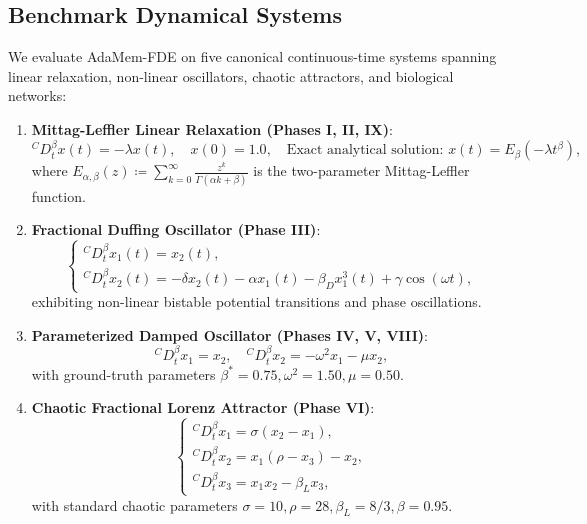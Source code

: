 \documentclass[11pt,a4paper]{article}
\theoremstyle{plain}
\theoremstyle{definition}
\newcommand{\cD}{{}^C D}
\begin{document}
\subsection{Benchmark Dynamical Systems}
We evaluate AdaMem-FDE on five canonical continuous-time systems spanning linear relaxation, non-linear oscillators, chaotic attractors, and biological networks:
\begin{enumerate}
    \item \textbf{Mittag-Leffler Linear Relaxation (Phases I, II, IX)}:
    \begin{equation}
        \cD_t^\beta x(t) = -\lambda x(t), \quad x(0) = 1.0, \quad \text{Exact analytical solution: } x(t) = E_\beta(-\lambda t^\beta),
    \end{equation}
    where $E_{\alpha, \beta}(z) \coloneqq \sum_{k=0}^\infty \frac{z^k}{\Gamma(\alpha k + \beta)}$ is the two-parameter Mittag-Leffler function.
    
    \item \textbf{Fractional Duffing Oscillator (Phase III)}:
    \begin{equation}
        \begin{cases}
            \cD_t^\beta x_1(t) = x_2(t), \\
            \cD_t^\beta x_2(t) = -\delta x_2(t) - \alpha x_1(t) - \beta_D x_1^3(t) + \gamma \cos(\omega t),
        \end{cases}
    \end{equation}
    exhibiting non-linear bistable potential transitions and phase oscillations.
    
    \item \textbf{Parameterized Damped Oscillator (Phases IV, V, VIII)}:
    \begin{equation}
        \cD_t^\beta x_1 = x_2, \quad \cD_t^\beta x_2 = -\omega^2 x_1 - \mu x_2,
    \end{equation}
    with ground-truth parameters $\beta^* = 0.75, \omega^2 = 1.50, \mu = 0.50$.
    
    \item \textbf{Chaotic Fractional Lorenz Attractor (Phase VI)}:
    \begin{equation}
        \begin{cases}
            \cD_t^\beta x_1 = \sigma (x_2 - x_1), \\
            \cD_t^\beta x_2 = x_1 (\rho - x_3) - x_2, \\
            \cD_t^\beta x_3 = x_1 x_2 - \beta_L x_3,
        \end{cases}
    \end{equation}
    with standard chaotic parameters $\sigma = 10, \rho = 28, \beta_L = 8/3, \beta = 0.95$.
    

\end{enumerate}
\end{document}
